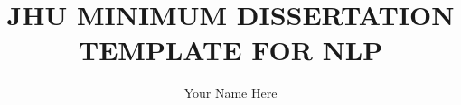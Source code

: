 \documentclass[12pt,oneside,final]{thesis}
\begin{document}
\title{\uppercase{JHU Minimum Dissertation Template for NLP}}
\author{Your Name Here}
\dissertation
\doctorphilosophy
\copyrightnotice





\appendix



%
\printbibliography


\end{document}
